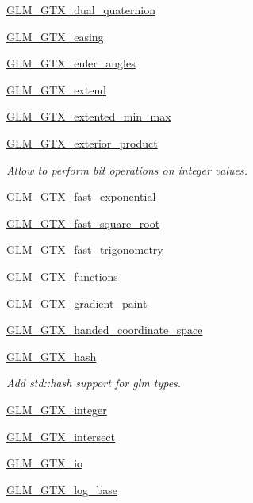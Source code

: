 \begin{DoxyCompactItemize}
\item 
\hyperlink{group__gtx__dual__quaternion}{G\+L\+M\+\_\+\+G\+T\+X\+\_\+dual\+\_\+quaternion}
\item 
\hyperlink{group__gtx__easing}{G\+L\+M\+\_\+\+G\+T\+X\+\_\+easing}
\item 
\hyperlink{group__gtx__euler__angles}{G\+L\+M\+\_\+\+G\+T\+X\+\_\+euler\+\_\+angles}
\item 
\hyperlink{group__gtx__extend}{G\+L\+M\+\_\+\+G\+T\+X\+\_\+extend}
\item 
\hyperlink{group__gtx__extended__min__max}{G\+L\+M\+\_\+\+G\+T\+X\+\_\+extented\+\_\+min\+\_\+max}
\item 
\hyperlink{group__gtx__exterior__product}{G\+L\+M\+\_\+\+G\+T\+X\+\_\+exterior\+\_\+product}
\begin{DoxyCompactList}\small\item\em Allow to perform bit operations on integer values. \end{DoxyCompactList}\item 
\hyperlink{group__gtx__fast__exponential}{G\+L\+M\+\_\+\+G\+T\+X\+\_\+fast\+\_\+exponential}
\item 
\hyperlink{group__gtx__fast__square__root}{G\+L\+M\+\_\+\+G\+T\+X\+\_\+fast\+\_\+square\+\_\+root}
\item 
\hyperlink{group__gtx__fast__trigonometry}{G\+L\+M\+\_\+\+G\+T\+X\+\_\+fast\+\_\+trigonometry}
\item 
\hyperlink{group__gtx__functions}{G\+L\+M\+\_\+\+G\+T\+X\+\_\+functions}
\item 
\hyperlink{group__gtx__gradient__paint}{G\+L\+M\+\_\+\+G\+T\+X\+\_\+gradient\+\_\+paint}
\item 
\hyperlink{group__gtx__handed__coordinate__space}{G\+L\+M\+\_\+\+G\+T\+X\+\_\+handed\+\_\+coordinate\+\_\+space}
\item 
\hyperlink{group__gtx__hash}{G\+L\+M\+\_\+\+G\+T\+X\+\_\+hash}
\begin{DoxyCompactList}\small\item\em Add std\+::hash support for glm types. \end{DoxyCompactList}\item 
\hyperlink{group__gtx__integer}{G\+L\+M\+\_\+\+G\+T\+X\+\_\+integer}
\item 
\hyperlink{group__gtx__intersect}{G\+L\+M\+\_\+\+G\+T\+X\+\_\+intersect}
\item 
\hyperlink{group__gtx__io}{G\+L\+M\+\_\+\+G\+T\+X\+\_\+io}
\item 
\hyperlink{group__gtx__log__base}{G\+L\+M\+\_\+\+G\+T\+X\+\_\+log\+\_\+base}

\end{DoxyCompactItemize}
